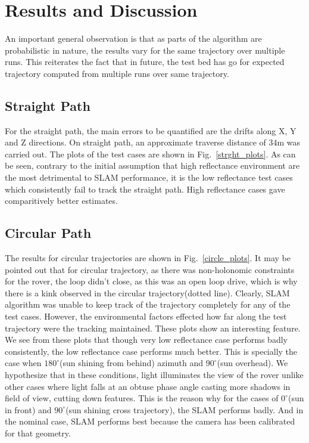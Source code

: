 \documentclass[a4paper, 10pt, conference]{ieeeconf}      %
\begin{document}
\section{Results and Discussion}
An important general observation is that as parts of the algorithm are probabilistic in nature, the results vary for the same trajectory over multiple runs. This reiterates the fact that in future, the test bed has go for expected trajectory computed from multiple runs over same trajectory.
\subsection{Straight Path}
For the straight path, the main errors to be quantified are the drifts along X, Y and Z directions. On straight path, an approximate traverse distance of 34m was carried out.  The plots of the test cases are shown in Fig.~\ref{strght_plots}. As can be seen, contrary to the initial assumption that high reflectance environment are the most detrimental to SLAM performance, it is the low reflectance test cases which consistently fail to track the straight path. High reflectance cases gave comparitively better estimates.
\subsection{Circular Path}
The results for circular trajectories are shown in Fig.~\ref{circle_plots}. It may be pointed out that for circular trajectory, as there was non-holonomic constraints for the rover, the loop didn't close, as this was an open loop drive, which is why there is a kink observed in the circular trajectory(dotted line).
 Clearly, SLAM algorithm was unable to keep track of the trajectory completely for any of the test cases. However, the environmental factors effected how far along the test trajectory were the tracking maintained. These plots show an interesting feature. We see from these plots that though very low reflectance case performs badly consistently, the low reflectance case performs much better. This is specially the case when $180^\circ$(sun shining from behind) azimuth and $90^\circ$(sun overhead). We hypothesize that in these conditions, light illuminates the view of the rover unlike other cases where light falls at an obtuse phase angle casting more shadows in field of view, cutting down features. This is the reason why for the cases of $0^\circ$(sun in front) and $90^\circ$(sun shining cross trajectory), the SLAM performs badly. And in the nominal case, SLAM performs best because the camera has been calibrated for that geometry. 
\end{document}
